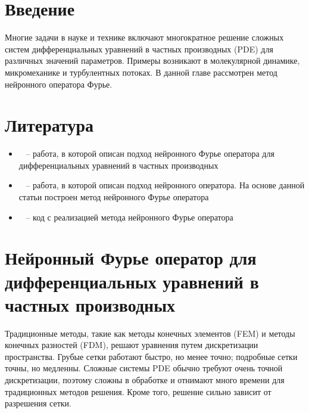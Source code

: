 \section{Введение}

Многие задачи в науке и технике включают многократное решение сложных систем дифференциальных уравнений в частных производных (PDE) для различных значений параметров. Примеры возникают в молекулярной динамике, микромеханике и турбулентных потоках. В данной главе рассмотрен метод нейронного оператора Фурье.

\section{Литература}

	\begin{itemize}
		\item ~\cite{FNO} --  работа, в которой описан подход нейронного Фурье оператора для  дифференциальных уравнений в частных производных
		\item ~\cite{Deeponet} -- работа, в которой описан подход нейронного оператора. На основе данной статьи построен метод нейронного Фурье оператора
		\item ~\cite{FNOcode} -- код с реализацией метода нейронного Фурье оператора 
	\end{itemize}


\section{Нейронный Фурье оператор для дифференциальных уравнений в частных производных}

Традиционные методы, такие как методы конечных элементов (FEM) и методы конечных разностей (FDM), решают уравнения путем дискретизации пространства. Грубые сетки работают быстро, но менее точно; подробные сетки точны, но медленны. Сложные системы PDE обычно требуют очень точной дискретизации, поэтому сложны в обработке и отнимают много времени для традиционных методов решения. Кроме того, решение сильно зависит от разрешения сетки.


